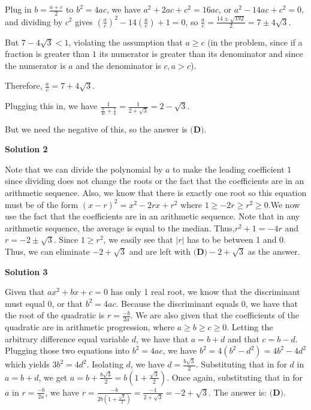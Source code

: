 \begin{enumerate}
 Plug in $b=\frac {a+c} {2}$ to $b^2=4ac$, we have $a^2+2ac+c^2=16ac$, or $a^2-14ac+c^2=0$, and dividing by $c^2$ gives $\left( \frac {a} {c} \right) ^2-14 \left( \frac {a} {c} \right) +1 = 0$, so $\frac {a} {c} = \frac {14 \pm \sqrt {192} } {2} = 7 \pm 4 \sqrt {3}$.

 But $7-4\sqrt {3} <1$, violating the assumption that $a \ge c$ (in the problem, since if a fraction is greater than $1$ its numerator is greater than its denominator and since the numerator is $a$ and the denominator is $c, a > c$).

 Therefore, $\frac {a} {c} = 7 +4\sqrt {3}$.

 Plugging this in, we have $\frac {1} {\frac {a} {4c} + \frac {1} {4} } = \frac {1} {2+ \sqrt {3} } = 2- \sqrt {3}$.

 But we need the negative of this, so the answer is $\boxed {\textbf{(D)}}.$




\textbf{Solution 2}

Note that we can divide the polynomial by $a$ to make the leading coefficient 1 since dividing does not change the roots or the fact that the coefficients are in an arithmetic sequence. Also, we know that there is exactly one root so this equation must be of the form $(x-r)^2 = x^2 - 2rx + r^2$ where $1 \ge -2r \ge r^2 \ge 0$.We now use the fact that the coefficients are in an arithmetic sequence. Note that in any arithmetic sequence, the average is equal to the median. Thus,$r^2 + 1 = -4r$ and $r = -2 \pm \sqrt{3}$. Since $1 \ge r^2$, we easily see that $|r|$ has to be between 1 and 0. Thus, we can eliminate $-2 + \sqrt{3}$ and are left with $\boxed{\textbf{(D)} -2 + \sqrt{3}}$ as the answer.

 



\textbf{Solution 3}

Given that $ax^2+bx+c=0$ has only 1 real root, we know that the discriminant must equal 0, or that $b^2=4ac$. Because the discriminant equals 0, we have that the root of the quadratic is $r=\frac {-b} {2a}$. We are also given that the coefficients of the quadratic are in arithmetic progression, where $a \ge b \ge c \ge 0$. Letting the arbitrary difference equal variable $d$, we have that $a=b+d$ and that $c=b-d$. Plugging those two equations into $b^2=4ac$, we have $b^2=4(b^2-d^2)=4b^2-4d^2$ which yields $3b^2=4d^2$. Isolating $d$, we have $d=\frac {b \sqrt{3}} {2}$. Substituting that in for $d$ in $a=b+d$, we get $a=b+\frac {b \sqrt{3}} {2}=b(1+\frac {\sqrt{3}} {2})$. Once again, substituting that in for $a$ in $r=\frac {-b} {2a}$, we have $r=\frac {-b} {2b(1+\frac {\sqrt{3}} {2})}=\frac {-1} {2+\sqrt {3}}=-2+\sqrt {3}$. The answer is: $\boxed {\textbf{(D)}}.$





\end{enumerate}
